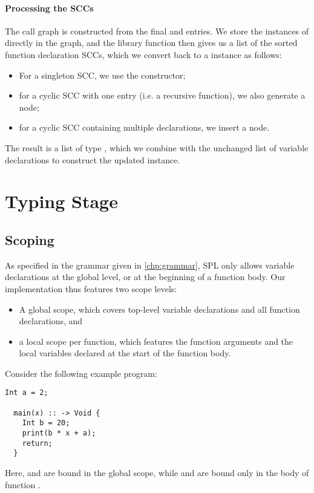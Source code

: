 \paragraph{Processing the SCCs}
The call graph is constructed from the final  and 
entries. We store the instances of  directly in the graph, and
the library function  then gives us a list of the sorted
function declaration SCCs, which we convert back to a  instance
as follows:
\begin{itemize}
  \item For a singleton SCC, we use the  constructor;
  \item for a cyclic SCC with one entry (i.e. a recursive function), we
        also generate a  node;
  \item for a cyclic SCC containing multiple declarations, we insert a
         node.
\end{itemize}
%
The result is a list of type , which we combine with
the unchanged list of variable declarations to construct the updated
 instance.



\section{Typing Stage} \label{sec:typing-stage}



\subsection{Scoping} \label{sec:scoping}
As specified in the grammar given in \cref{chp:grammar}, SPL only allows
variable declarations at the global level, or at the beginning of a function
body. Our implementation thus features two scope levels:
\begin{itemize}
  \item A global scope, which covers top-level variable declarations and all
        function declarations, and
  \item a local scope per function, which features the function arguments and
        the local variables declared at the start of the function body.
\end{itemize}

Consider the following example program:
%
\begin{lstlisting}[language=SPL]
  Int a = 2;

  main(x) :: -> Void {
    Int b = 20;
    print(b * x + a);
    return;
  }
\end{lstlisting}
%
Here,  and  are bound in the global scope, while  and
 are bound only in the body of function .

